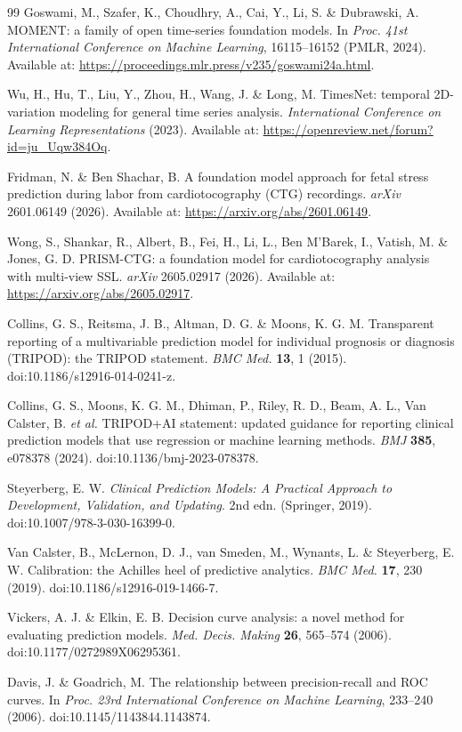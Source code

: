 \documentclass[11pt]{article}
\begin{document}
\begin{thebibliography}{99}
Goswami, M., Szafer, K., Choudhry, A., Cai, Y., Li, S. \& Dubrawski, A.
MOMENT: a family of open time-series foundation models.
In \textit{Proc. 41st International Conference on Machine Learning}, 16115--16152 (PMLR, 2024).
Available at: \url{https://proceedings.mlr.press/v235/goswami24a.html}.

Wu, H., Hu, T., Liu, Y., Zhou, H., Wang, J. \& Long, M.
TimesNet: temporal 2D-variation modeling for general time series analysis.
\textit{International Conference on Learning Representations} (2023).
Available at: \url{https://openreview.net/forum?id=ju_Uqw384Oq}.

Fridman, N. \& Ben Shachar, B.
A foundation model approach for fetal stress prediction during labor from cardiotocography (CTG) recordings.
\textit{arXiv} 2601.06149 (2026).
Available at: \url{https://arxiv.org/abs/2601.06149}.

Wong, S., Shankar, R., Albert, B., Fei, H., Li, L., Ben M'Barek, I., Vatish, M. \& Jones, G. D.
PRISM-CTG: a foundation model for cardiotocography analysis with multi-view SSL.
\textit{arXiv} 2605.02917 (2026).
Available at: \url{https://arxiv.org/abs/2605.02917}.

Collins, G. S., Reitsma, J. B., Altman, D. G. \& Moons, K. G. M.
Transparent reporting of a multivariable prediction model for individual prognosis or diagnosis (TRIPOD): the TRIPOD statement.
\textit{BMC Med.} \textbf{13}, 1 (2015).
doi:10.1186/s12916-014-0241-z.

Collins, G. S., Moons, K. G. M., Dhiman, P., Riley, R. D., Beam, A. L., Van Calster, B. \textit{et al.}
TRIPOD+AI statement: updated guidance for reporting clinical prediction models that use regression or machine learning methods.
\textit{BMJ} \textbf{385}, e078378 (2024).
doi:10.1136/bmj-2023-078378.

Steyerberg, E. W.
\textit{Clinical Prediction Models: A Practical Approach to Development, Validation, and Updating}.
2nd edn. (Springer, 2019).
doi:10.1007/978-3-030-16399-0.

Van Calster, B., McLernon, D. J., van Smeden, M., Wynants, L. \& Steyerberg, E. W.
Calibration: the Achilles heel of predictive analytics.
\textit{BMC Med.} \textbf{17}, 230 (2019).
doi:10.1186/s12916-019-1466-7.

Vickers, A. J. \& Elkin, E. B.
Decision curve analysis: a novel method for evaluating prediction models.
\textit{Med. Decis. Making} \textbf{26}, 565--574 (2006).
doi:10.1177/0272989X06295361.

Davis, J. \& Goadrich, M.
The relationship between precision-recall and ROC curves.
In \textit{Proc. 23rd International Conference on Machine Learning}, 233--240 (2006).
doi:10.1145/1143844.1143874.

\end{thebibliography}

        
\end{document}
